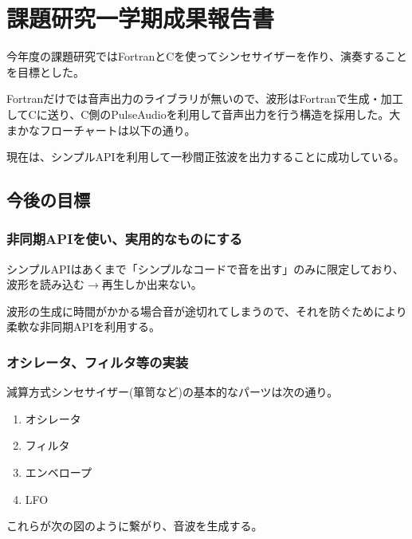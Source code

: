 \documentclass[dvipdfmx]{article}
\begin{document}
\section*{課題研究一学期成果報告書}
今年度の課題研究ではFortranとCを使ってシンセサイザーを作り、演奏することを目標とした。\par
Fortranだけでは音声出力のライブラリが無いので、波形はFortranで生成・加工してCに送り、C側のPulseAudioを利用して音声出力を行う構造を採用した。大まかなフローチャートは以下の通り。\par
{}

現在は、シンプルAPIを利用して一秒間正弦波を出力することに成功している。\par

\subsection*{今後の目標}
\subsubsection*{非同期APIを使い、実用的なものにする}
シンプルAPIはあくまで「シンプルなコードで音を出す」のみに限定しており、波形を読み込む$\to$再生しか出来ない。\par
波形の生成に時間がかかる場合音が途切れてしまうので、それを防ぐためにより柔軟な非同期APIを利用する。
\subsubsection*{オシレータ、フィルタ等の実装}
減算方式シンセサイザー(箪笥など)の基本的なパーツは次の通り。
\begin{enumerate}
\item オシレータ
\item フィルタ
\item エンベロープ
\item LFO
\end{enumerate}
これらが次の図のように繋がり、音波を生成する。\par
\end{document}
